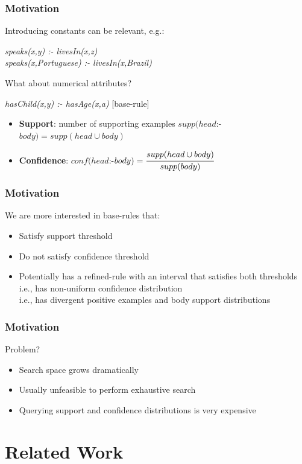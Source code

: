 \documentclass{beamer}
\begin{document}
\begin{frame}
\frametitle{Motivation}
Introducing constants can be relevant, e.g.:
\begin{center}
  \emph{speaks(x,y) :- livesIn(x,z)}\\
  \emph{speaks(x,Portuguese) :- livesIn(x,Brazil)}
\end{center}
What about numerical attributes?
\begin{center}
  \emph{hasChild(x,y) :- hasAge(x,a)} [base-rule]
\end{center}
\begin{itemize}
 \item \textbf{Support}: number of supporting examples
  $supp(head$:-$body)=supp(head \cup body)$
 \item \textbf{Confidence}: $conf(head$:-$body)=\cfrac{supp(head \cup body)}{supp(body)}$ 
\end{itemize}
\end{frame}

\begin{frame}
\frametitle{Motivation}
 We are more interested in base-rules that:
 \begin{itemize}
  \item Satisfy support threshold
  \item Do not satisfy confidence threshold
  \item Potentially has a refined-rule with an interval that satisfies both thresholds \\
    \quad i.e., has non-uniform confidence distribution \\
    \quad i.e., has divergent positive examples and body support distributions
 \end{itemize}
\end{frame}

\begin{frame}
\frametitle{Motivation}
 Problem?
 \begin{itemize}
    \item Search space grows dramatically
    \item Usually unfeasible to perform exhaustive search
    \item Querying support and confidence distributions is very expensive
 \end{itemize}
\end{frame}

\section{Related Work}
\end{document}

